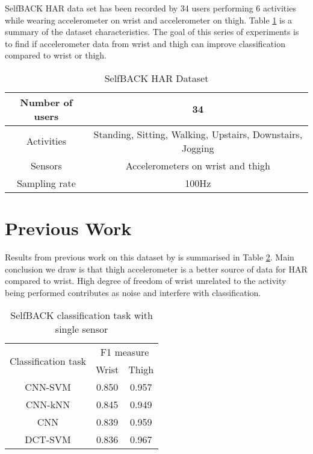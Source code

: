 SelfBACK HAR data set has been recorded by 34 users performing 6 activities while wearing accelerometer on wrist and accelerometer on thigh. Table \ref{table:dataset} is a summary of the dataset characteristics. The goal of this series of experiments is to find if accelerometer data from wrist and thigh can improve classification compared to wrist or thigh.

\begin{table}[ht]
\caption{SelfBACK HAR Dataset}
\label{table:dataset}
\begin{center}
\begin{tabular}{|c|c|} 
  \hline
  Number of users & 34 \\
  \hline
  Activities & Standing, Sitting, Walking, Upstairs, Downstairs, Jogging \\
  \hline
  Sensors & Accelerometers on wrist and thigh \\
  \hline
  Sampling rate & 100Hz \\
  \hline
\end{tabular}
\end{center}
\end{table}

\section*{Previous Work}
\label{sec:old}
Results from previous work on this dataset by  is summarised in Table \ref{table:results1}. Main conclusion we draw is that thigh accelerometer is a better source of data for HAR compared to wrist. High degree of freedom of wrist unrelated to the activity being performed contributes as noise and interfere with classification. 

\begin{table}[ht]
\caption{SelfBACK classification task with single sensor}
\label{table:results1}
\begin{center}
\begin{tabular}{|c|c|c|} 
  \hline
  \multirow{2}{*}{Classification task} & \multicolumn{2}{|c|}{F1 measure} \\\cline{2-3}
  & Wrist & Thigh \\
  \hline
  CNN-SVM & 0.850 & 0.957 \\
  \hline
  CNN-kNN & 0.845 & 0.949 \\
  \hline
  CNN & 0.839 & 0.959 \\
  \hline
  DCT-SVM & 0.836 & 0.967 \\
  \hline
\end{tabular}
\end{center}
\end{table}

